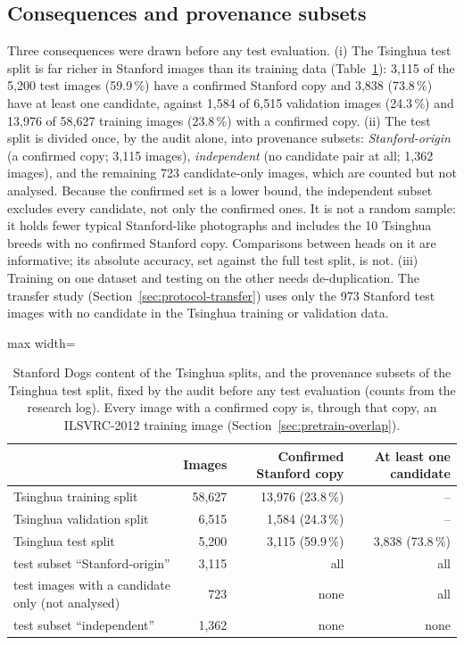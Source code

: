 \documentclass[11pt,a4paper]{article}
\theoremstyle{plain}
\begin{document}
\subsection{Consequences and provenance subsets}\label{sec:provenance}
Three consequences were drawn before any test evaluation.
(i) The Tsinghua test split is far richer in Stanford images than its training data
(Table~\ref{tab:provsets}): 3,115 of the 5,200 test images (59.9\,\%) have a confirmed Stanford copy and 3,838
(73.8\,\%) have at least one candidate, against 1,584 of 6,515 validation images (24.3\,\%) and 13,976 of 58,627
training images (23.8\,\%) with a confirmed copy.
(ii) The test split is divided once, by the audit alone, into provenance subsets: \emph{Stanford-origin} (a confirmed
copy; 3,115 images), \emph{independent} (no candidate pair at all; 1,362 images), and the remaining 723 candidate-only
images, which are counted but not analysed. Because the confirmed set is a lower bound, the independent subset
excludes every candidate, not only the confirmed ones. It is not a random sample: it holds fewer typical Stanford-like
photographs and includes the 10 Tsinghua breeds with no confirmed Stanford copy. Comparisons between heads on it are
informative; its absolute accuracy, set against the full test split, is not.
(iii) Training on one dataset and testing on the other needs de-duplication. The transfer study
(Section~\ref{sec:protocol-transfer}) uses only the 973 Stanford test images with no candidate in the Tsinghua
training or validation data.

\begin{table}[!htbp]
\centering
\caption{Stanford Dogs content of the Tsinghua splits, and the provenance subsets of the Tsinghua test split, fixed
by the audit before any test evaluation (counts from the research log). Every image with a confirmed copy is,
through that copy, an ILSVRC-2012 training image (Section~\ref{sec:pretrain-overlap}).}
\label{tab:provsets}
\small
\begin{adjustbox}{max width=\textwidth}
\begin{tabular}{@{}lrrr@{}}
\toprule
 & Images & Confirmed Stanford copy & At least one candidate\\
\midrule
Tsinghua training split & 58,627 & 13,976 (23.8\,\%) & --\\
Tsinghua validation split & 6,515 & 1,584 (24.3\,\%) & --\\
Tsinghua test split & 5,200 & 3,115 (59.9\,\%) & 3,838 (73.8\,\%)\\
\midrule
\quad test subset ``Stanford-origin'' & 3,115 & all & all\\
\quad test images with a candidate only (not analysed) & 723 & none & all\\
\quad test subset ``independent'' & 1,362 & none & none\\
\bottomrule
\end{tabular}
\end{adjustbox}
\end{table}
\end{document}

